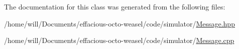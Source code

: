 The documentation for this class was generated from the following files\+:\begin{DoxyCompactItemize}
\item 
/home/will/\+Documents/effacious-\/octo-\/weasel/code/simulator/\hyperlink{_message_8hpp}{Message.\+hpp}\item 
/home/will/\+Documents/effacious-\/octo-\/weasel/code/simulator/\hyperlink{_message_8cpp}{Message.\+cpp}\end{DoxyCompactItemize}
